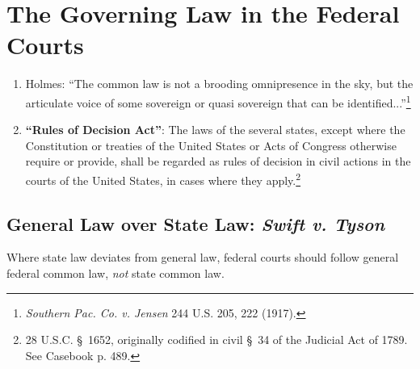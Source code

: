 \section{The Governing Law in the Federal Courts}

\begin{enumerate}
    \item Holmes: ``The common law is not a brooding omnipresence in the sky, 
    but the articulate voice of some sovereign or quasi sovereign that can be 
    identified...''\footnote{\emph{Southern Pac. Co. v. Jensen} 244 U.S. 205, 
    222 (1917).}
    \item \textbf{``Rules of Decision Act''}: The laws of the several states, 
    except where the Constitution or treaties of the United States or Acts of 
    Congress otherwise require or provide, shall be regarded as rules of 
    decision in civil actions in the courts of the United States, in cases 
    where they apply.\footnote{28 U.S.C. \S\ 1652, originally codified in 
    civil \S\ 34 of the Judicial Act of 1789. See Casebook p. 489.}
\end{enumerate}

\subsection{General Law over State Law: \emph{Swift v. Tyson}}

Where state law deviates from general law, federal courts should follow 
general federal common law, \emph{not} state common law.

